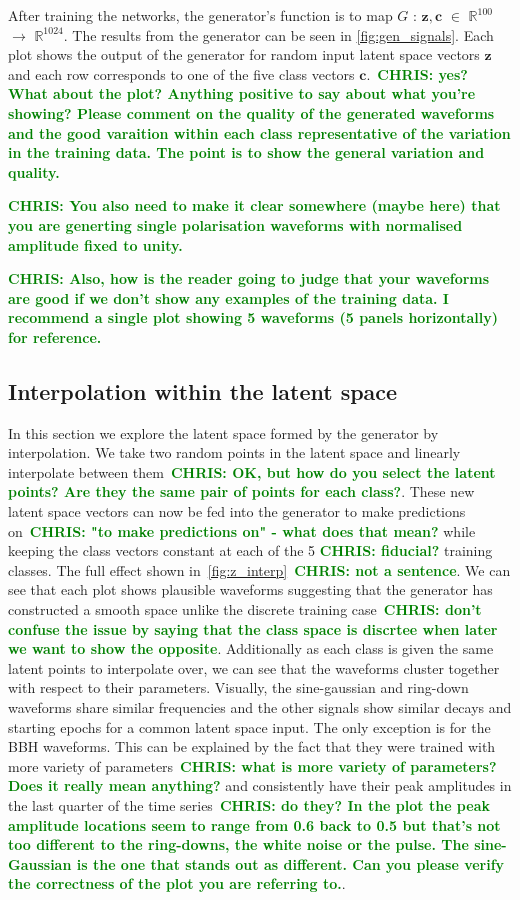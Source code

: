 \documentclass[12pt]{iopart}
\newcommand{\chris}[1]{\textbf{\textcolor{green}{CHRIS: #1}}}
\begin{document}
After training the networks, the generator's function is to map $G$ : $\mathbf{z},\mathbf{c} $ $\in$
$\mathbb{R}^{100}$ $\to$ $\mathbb{R}^{1024}$. The results from the
generator can be seen in \cref{fig:gen_signals}. Each plot shows the output of
the generator for random input latent space vectors $\mathbf{z}$ and each row
corresponds to one of the five class vectors $\mathbf{c}$.~\chris{yes? What
about the plot? Anything positive to say about what you're showing? Please
comment on the quality of the generated waveforms and the good varaition within
each class representative of the variation in the training data. The point is
to show the general variation and quality.}

\chris{You also need to make it clear somewhere (maybe here) that you are
generting single polarisation waveforms with normalised amplitude fixed to
unity.}

\chris{Also, how is the reader going to judge that your waveforms are good if
we don't show any examples of the training data. I recommend a single plot
showing 5 waveforms (5 panels horizontally) for reference.}

\subsection{Interpolation within the latent space}

%
In this section we explore the latent space formed by the generator by interpolation. We take two random
points in the latent space and linearly interpolate between them~\chris{OK, but
how do you select the latent points? Are they the same pair of points for each
class?}. These new latent space vectors can now be fed into the generator to
make predictions on~\chris{"to make predictions on" - what does that mean?}
while keeping the class vectors constant at each of the 5 \chris{fiducial?}
training classes. The full effect shown in~\cref{fig:z_interp}~\chris{not a
sentence}. We can see that each plot shows plausible waveforms suggesting that
the generator has constructed a smooth space unlike the discrete training
case~\chris{don't confuse the issue by saying that the class space is discrtee
when later we want to show the opposite}. Additionally as each class is given
the same latent points to interpolate over, we can see that the waveforms
cluster together with respect to their parameters. Visually, the sine-gaussian
and ring-down waveforms share similar frequencies and the other signals show
similar decays and starting epochs for a common latent space input. The only
exception is for the \ac{BBH} waveforms. This can be explained by the fact that
they were trained with more variety of parameters~\chris{what is more variety
of parameters? Does it really mean anything?} and consistently have their peak
amplitudes in the last quarter of the time series~\chris{do they? In the plot
the peak amplitude locations seem to range from 0.6 back to 0.5 but that's not
too different to the ring-downs, the white noise or the pulse. The
sine-Gaussian is the one that stands out as different. Can you please verify
the correctness of the plot you are referring to.}.
\end{document}
